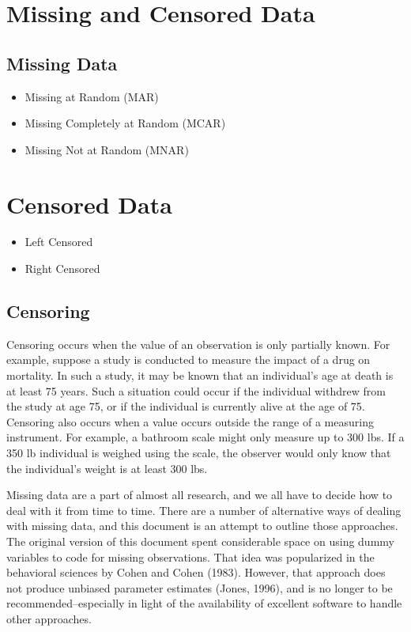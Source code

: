 \section{Missing and Censored Data}
\subsection{Missing Data}


\begin{itemize}
\item Missing at Random (MAR)
\item Missing Completely at Random (MCAR)
\item Missing Not at Random (MNAR)
\end{itemize}

\section{Censored Data}

\begin{itemize}
\item Left Censored
\item Right Censored
\end{itemize}

\subsection{Censoring}
Censoring occurs when the value of an observation is only partially known. 
For example, suppose a study is conducted to measure the impact of a drug on mortality. 
In such a study, it may be known that an individual's age at death is at least 75 years. 
Such a situation could occur if the individual withdrew from the study at age 75, or if the individual is currently 
alive at the age of 75.
Censoring also occurs when a value occurs outside the range of a measuring instrument. 
For example, a bathroom scale might only measure up to 300 lbs. 
If a 350 lb individual is weighed using the scale, the observer would only know that the individual's weight is at 
least 300 lbs.

\newpage

Missing data are a part of almost all research, and we all have to decide how to deal with it from time to time. There are a number of alternative ways of dealing with missing data, and this document is an attempt to outline those approaches. The original version of this document spent considerable space on using dummy variables to code for missing observations. That idea was popularized in the behavioral sciences by Cohen and Cohen (1983). However, that approach does not produce unbiased parameter estimates (Jones, 1996), and is no longer to be recommended--especially in light of the availability of excellent software to handle other approaches. 

